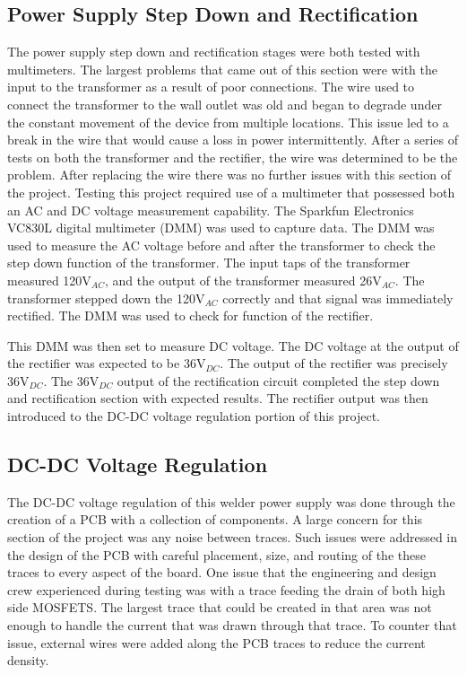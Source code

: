 \documentclass[11pt]{article}
\begin{document}
    \subsection{Power Supply Step Down and Rectification}
    The power supply step down and rectification stages were both tested with multimeters. The largest problems that came out of this section were with the input to the transformer as a result of poor connections. The wire used to connect the transformer to the wall outlet was old and began to degrade under the constant movement of the device from multiple locations. This issue led to a break in the wire that would cause a loss in power intermittently. After a series of tests on both the transformer and the rectifier, the wire was determined to be the problem. After replacing the wire there was no further issues with this section of the project. Testing this project required use of a multimeter that possessed both an AC and DC voltage measurement capability. The Sparkfun Electronics VC830L digital multimeter (DMM) was used to capture data. The DMM was used to measure the AC voltage before and after the transformer to check the step down function of the transformer. The input taps of the transformer measured 120V$_{AC}$, and the output of the transformer measured 26V$_{AC}$. The transformer stepped down the 120V$_{AC}$ correctly and that signal was immediately rectified. The DMM was used to check for function of the rectifier.
    
    This DMM was then set to measure DC voltage. The DC voltage at the output of the rectifier was expected to be 36V$_{DC}$. The output of the rectifier was precisely 36V$_{DC}$. The 36V$_{DC}$ output of the rectification circuit completed the step down and rectification section with expected results. The rectifier output was then introduced to the DC-DC voltage regulation portion of this project. 
    
        
    \subsection{DC-DC Voltage Regulation}
       The DC-DC voltage regulation of this welder power supply was done through the creation of a PCB with a collection of components. A large concern for this section of the project was any noise between traces. Such issues were addressed in the design of the PCB with careful placement, size, and routing of the these traces to every aspect of the board. One issue that the engineering and design crew experienced during testing was with a trace feeding the drain of both high side MOSFETS. The largest trace that could be created in that area was not enough to handle the current that was drawn through that trace. To counter that issue, external wires were added along the PCB traces to reduce the current density. 
       
\end{document}

